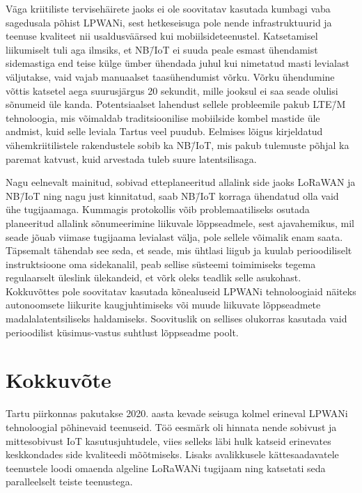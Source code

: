 \documentclass[12pt]{article}
\begin{document}
    Väga kriitiliste tervisehäirete jaoks ei ole soovitatav kasutada kumbagi vaba sagedusala põhist LPWANi, sest hetkeseisuga pole nende infrastruktuurid ja teenuse kvaliteet nii usaldusväärsed kui mobiilsideteenustel.
    Katsetamisel liikumiselt tuli aga ilmsiks, et NB\=/IoT ei suuda peale esmast ühendamist sidemastiga end teise külge ümber ühendada juhul kui nimetatud masti levialast väljutakse, vaid vajab manuaalset taasühendumist võrku.
    Võrku ühendumine võttis katsetel aega suurusjärgus 20 sekundit, mille jooksul ei saa seade olulisi sõnumeid üle kanda.
    Potentsiaalset lahendust sellele probleemile pakub LTE\=/M tehnoloogia, mis võimaldab traditsioonilise mobiilside kombel mastide üle andmist, kuid selle leviala Tartus veel puudub.
    Eelmises lõigus kirjeldatud vähemkriitilistele rakendustele sobib ka NB\=/IoT, mis pakub tulemuste põhjal ka paremat katvust, kuid arvestada tuleb suure latentsilisaga.

    Nagu eelnevalt mainitud, sobivad etteplaneeritud allalink side jaoks LoRaWAN ja NB\=/IoT ning nagu just kinnitatud, saab NB\=/IoT korraga ühendatud olla vaid ühe tugijaamaga.
    Kummagis protokollis võib problemaatiliseks osutada planeeritud allalink sõnumeerimine liikuvale lõppseadmele, sest ajavahemikus, mil seade jõuab viimase tugijaama levialast välja, pole sellele võimalik enam saata.
    Täpsemalt tähendab see seda, et seade, mis ühtlasi liigub ja kuulab perioodiliselt instruktsioone oma sidekanalil, peab sellise süsteemi toimimiseks tegema regulaarselt üleslink ülekandeid, et võrk oleks teadlik selle asukohast.
    Kokkuvõttes pole soovitatav kasutada kõnealuseid LPWANi tehnoloogiaid näiteks autonoomsete liikurite kaugjuhtimiseks või muude liikuvate lõppseadmete madalalatentsiliseks haldamiseks.
    Soovituslik on sellises olukorras kasutada vaid perioodilist küsimus-vastus suhtlust lõppseadme poolt.

    \newpage

    \section{Kokkuvõte}
    Tartu piirkonnas pakutakse 2020. aasta kevade seisuga kolmel erineval LPWANi tehnoloogial põhinevaid teenuseid.
    Töö eesmärk oli hinnata nende sobivust ja mittesobivust IoT kasutusjuhtudele, viies selleks läbi hulk katseid erinevates keskkondades side kvaliteedi mõõtmiseks.
    Lisaks avalikkusele kättesaadavatele teenustele loodi omaenda algeline LoRaWANi tugijaam ning katsetati seda paralleelselt teiste teenustega.
\end{document}
